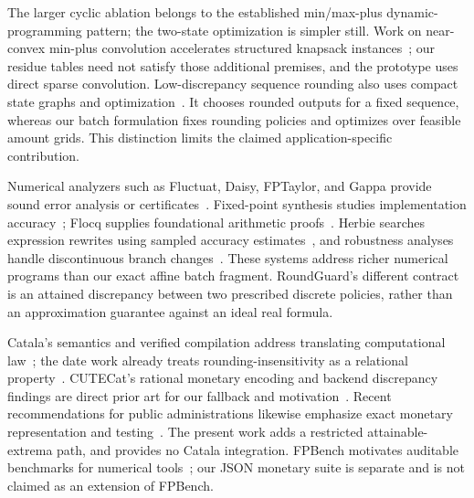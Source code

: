 \documentclass[11pt]{article}
\begin{document}
The larger cyclic ablation belongs to the established min/max-plus dynamic-programming pattern; the two-state optimization is simpler still. Work on near-convex min-plus convolution accelerates structured knapsack instances~\citep{bringmann_cassis2023}; our residue tables need not satisfy those additional premises, and the prototype uses direct sparse convolution. Low-discrepancy sequence rounding also uses compact state graphs and optimization~\citep{sadakane2001}. It chooses rounded outputs for a fixed sequence, whereas our batch formulation fixes rounding policies and optimizes over feasible amount grids. This distinction limits the claimed application-specific contribution.

Numerical analyzers such as Fluctuat, Daisy, FPTaylor, and Gappa provide sound error analysis or certificates~\citep{fluctuat2011,daisy2018,fptaylor2015,gappa2010}. Fixed-point synthesis studies implementation accuracy~\citep{fixedpoint2013}; Flocq supplies foundational arithmetic proofs~\citep{flocq2011}. Herbie searches expression rewrites using sampled accuracy estimates~\citep{herbie2015}, and robustness analyses handle discontinuous branch changes~\citep{robust2013}. These systems address richer numerical programs than our exact affine batch fragment. RoundGuard's different contract is an attained discrepancy between two prescribed discrete policies, rather than an approximation guarantee against an ideal real formula.

Catala's semantics and verified compilation address translating computational law~\citep{catala2021}; the date work already treats rounding-insensitivity as a relational property~\citep{date2024}. CUTECat's rational monetary encoding and backend discrepancy findings are direct prior art for our fallback and motivation~\citep{cutecat2025}. Recent recommendations for public administrations likewise emphasize exact monetary representation and testing~\citep{codinglaws2026}. The present work adds a restricted attainable-extrema path, and provides no Catala integration. FPBench motivates auditable benchmarks for numerical tools~\citep{fpbench2017}; our JSON monetary suite is separate and is not claimed as an extension of FPBench.
\end{document}
